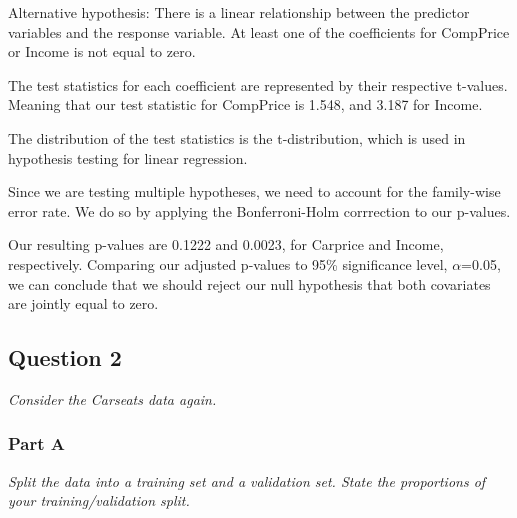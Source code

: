 \documentclass[
]{article}
\newenvironment{Shaded}{\begin{snugshade}}{\end{snugshade}}
\newcommand{\CommentTok}[1]{\textcolor[rgb]{0.56,0.35,0.01}{\textit{#1}}}
\newcommand{\DecValTok}[1]{\textcolor[rgb]{0.00,0.00,0.81}{#1}}
\newcommand{\FloatTok}[1]{\textcolor[rgb]{0.00,0.00,0.81}{#1}}
\newcommand{\FunctionTok}[1]{\textcolor[rgb]{0.00,0.00,0.00}{#1}}
\newcommand{\NormalTok}[1]{#1}
\newcommand{\OtherTok}[1]{\textcolor[rgb]{0.56,0.35,0.01}{#1}}
\newcommand{\SpecialCharTok}[1]{\textcolor[rgb]{0.00,0.00,0.00}{#1}}
\begin{document}
Alternative hypothesis: There is a linear relationship between the
predictor variables and the response variable. At least one of the
coefficients for CompPrice or Income is not equal to zero.

The test statistics for each coefficient are represented by their
respective t-values. Meaning that our test statistic for CompPrice is
1.548, and 3.187 for Income.

The distribution of the test statistics is the t-distribution, which is
used in hypothesis testing for linear regression.

Since we are testing multiple hypotheses, we need to account for the
family-wise error rate. We do so by applying the Bonferroni-Holm
corrrection to our p-values.

Our resulting p-values are 0.1222 and 0.0023, for Carprice and Income,
respectively. Comparing our adjusted p-values to 95\% significance
level, \(\alpha\)=0.05, we can conclude that we should reject our null
hypothesis that both covariates are jointly equal to zero.

\hypertarget{question-2}{%
\subsection{Question 2}\label{question-2}}

\emph{Consider the Carseats data again.}

\hypertarget{part-a-1}{%
\subsubsection{Part A}\label{part-a-1}}

\emph{Split the data into a training set and a validation set. State the
proportions of your training/validation split.}

\begin{Shaded}
\end{Shaded}
\end{document}
